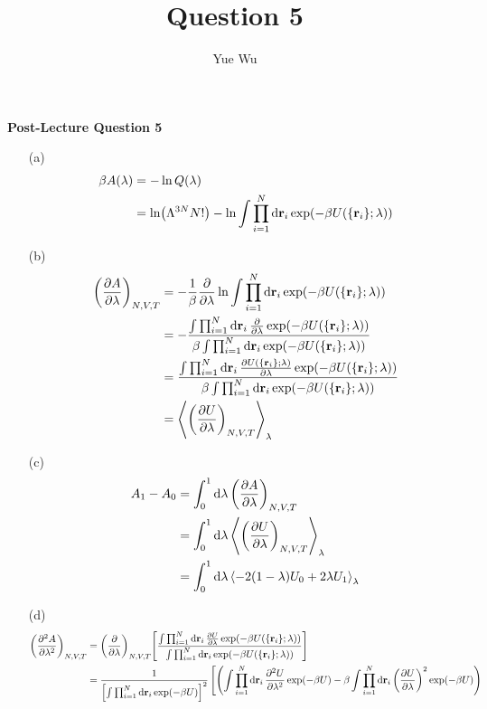 \documentclass{article}
\title{Question 5}
\author{Yue Wu}
\begin{document}
    \begin{center}
        \LARGE\textbf{Post-Lecture Question 5}
    \end{center}

    \begin{enumerate}
        \item[(a)]
        \begin{align*}
            \beta A(\lambda)&=-\ln Q(\lambda)\\
            &=\ln(\Lambda^{3N} N!)-\ln\int\prod_{i=1}^{N}\dd{\vb{r}_i}\exp(-\beta U(\{\vb{r}_i\};\lambda))
        \end{align*}
        \item[(b)]
        \begin{align*}
            \qty(\pdv{A}{\lambda})_{N,V,T}&=-\frac{1}{\beta}\pdv{\lambda}\ln\int\prod_{i=1}^{N}\dd{\vb{r}_i}\exp(-\beta U(\{\vb{r}_i\};\lambda))\\
            &=-\frac{\int\prod_{i=1}^{N}\dd{\vb{r}_i}\pdv{\lambda}\exp(-\beta U(\{\vb{r}_i\};\lambda))}{\beta\int\prod_{i=1}^{N}\dd{\vb{r}_i}\exp(-\beta U(\{\vb{r}_i\};\lambda))}\\
            &=\frac{\int\prod_{i=1}^{N}\dd{\vb{r}_i}\pdv{U(\{\vb{r}_i\};\lambda)}{\lambda}\exp(-\beta U(\{\vb{r}_i\};\lambda))}{\beta\int\prod_{i=1}^{N}\dd{\vb{r}_i}\exp(-\beta U(\{\vb{r}_i\};\lambda))}\\
            &=\expval{\qty(\pdv{U}{\lambda})_{N,V,T}}_\lambda
        \end{align*}
        \item[(c)]
        \begin{align*}
            A_1-A_0&=\int_{0}^{1}\dd{\lambda}\qty(\pdv{A}{\lambda})_{N,V,T}\\
            &=\int_{0}^{1}\dd{\lambda}\expval{\qty(\pdv{U}{\lambda})_{N,V,T}}_\lambda\\
            &=\int_{0}^{1}\dd{\lambda}\expval{-2(1-\lambda)U_0+2\lambda U_1}_\lambda
        \end{align*}
        \item[(d)]
        \begin{align*}
            \qty(\pdv[2]{A}{\lambda})_{N,V,T}&=\qty(\pdv{\lambda})_{N,V,T}\qty[\frac{\int\prod_{i=1}^{N}\dd{\vb{r}_i}\pdv{U}{\lambda}\exp(-\beta U(\{\vb{r}_i\};\lambda))}{\int\prod_{i=1}^{N}\dd{\vb{r}_i}\exp(-\beta U(\{\vb{r}_i\};\lambda))}]\\
            &=\frac{1}{\qty[\int\prod_{i=1}^{N}\dd{\vb{r}_i}\exp(-\beta U)]^2}\left[\qty(\int\prod_{i=1}^{N}\dd{\vb{r}_i}\pdv[2]{U}{\lambda}\exp(-\beta U)-\beta\int\prod_{i=1}^{N}\dd{\vb{r}_i}\qty(\pdv{U}{\lambda})^2\exp(-\beta U))\right.\\

\end{align*}
\end{enumerate}
\end{document}
